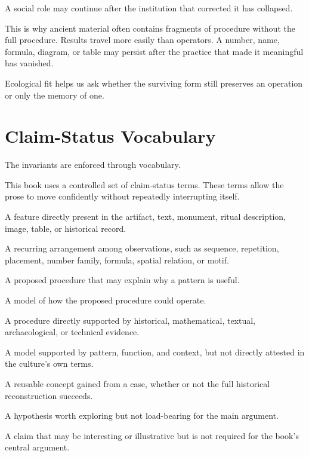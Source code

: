 \documentclass[11pt]{book}
\begin{document}
A social role may continue after the institution that corrected it has collapsed.

This is why ancient material often contains fragments of procedure without the full procedure. Results travel more easily than operators. A number, name, formula, diagram, or table may persist after the practice that made it meaningful has vanished.

Ecological fit helps us ask whether the surviving form still preserves an operation or only the memory of one.

\section{Claim-Status Vocabulary}

The invariants are enforced through vocabulary.

This book uses a controlled set of claim-status terms. These terms allow the prose to move confidently without repeatedly interrupting itself.

\begin{description}[leftmargin=3.2cm, style=nextline]
    \item[Observation]
    A feature directly present in the artifact, text, monument, ritual description, image, table, or historical record.

    \item[Pattern]
    A recurring arrangement among observations, such as sequence, repetition, placement, number family, formula, spatial relation, or motif.

    \item[Operator Hypothesis]
    A proposed procedure that may explain why a pattern is useful.

    \item[Reconstruction]
    A model of how the proposed procedure could operate.

    \item[Attested Procedure]
    A procedure directly supported by historical, mathematical, textual, archaeological, or technical evidence.

    \item[Structural Reconstruction]
    A model supported by pattern, function, and context, but not directly attested in the culture's own terms.

    \item[Extracted Primitive]
    A reusable concept gained from a case, whether or not the full historical reconstruction succeeds.

    \item[Speculative Frontier]
    A hypothesis worth exploring but not load-bearing for the main argument.

    \item[Not Load-Bearing]
    A claim that may be interesting or illustrative but is not required for the book's central argument.
\end{description}
\end{document}
